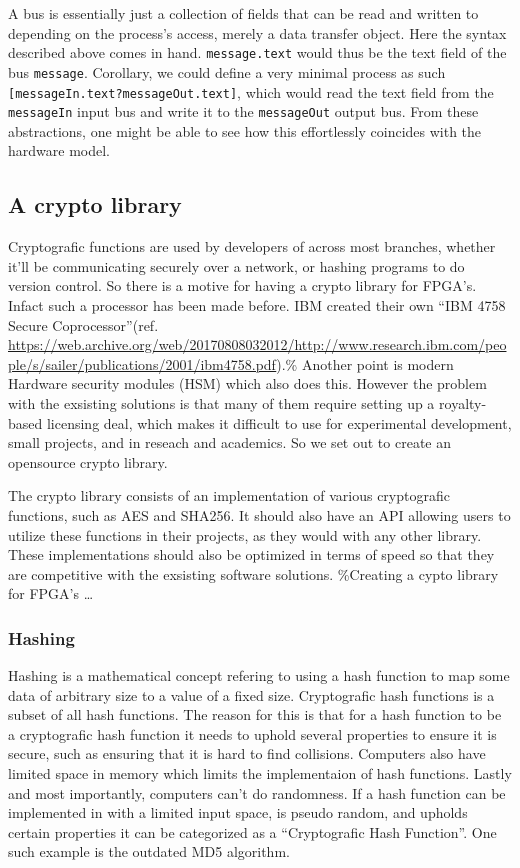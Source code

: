 \documentclass[a4paper]{article}
\begin{document}
A bus is essentially just a collection of fields that can be read and written to depending on the process's access, merely a data transfer object. Here the syntax described above comes in hand. \texttt{message.text} would thus be the text field of the bus \texttt{message}. Corollary, we could define a very minimal process as such \texttt{[messageIn.text?messageOut.text]}, which would read the text field from the \texttt{messageIn} input bus and write it to the \texttt{messageOut} output bus. From these abstractions, one might be able to see how this effortlessly coincides with the hardware model.
\subsection{A crypto library}
\label{sec:org9738384}
Cryptografic functions are used by developers of across most branches, whether it'll be communicating securely over a network, or hashing programs to do version control.
So there is a motive for having a crypto library for FPGA's. Infact such a processor has been made before. IBM created their own ``IBM 4758 Secure Coprocessor''(ref. \url{https://web.archive.org/web/20170808032012/http://www.research.ibm.com/people/s/sailer/publications/2001/ibm4758.pdf}).\% Another point is modern Hardware security modules (HSM) which also does this.
However the problem with the exsisting solutions is that many of them require setting up a royalty-based licensing deal, which makes it difficult to use for experimental development, small projects, and in reseach and academics.
So we set out to create an opensource crypto library.

The crypto library consists of an implementation of various cryptografic functions, such as AES and SHA256. It should also have an API allowing users to utilize these functions in their projects, as they would with any other library.
These implementations should also be optimized in terms of speed so that they are competitive with the exsisting software solutions.
\%Creating a cypto library for FPGA's \ldots{}
\subsubsection{Hashing}
\label{sec:org27ba90d}
Hashing is a mathematical concept refering to using a hash function to map some data of arbitrary size to a value of a fixed size. Cryptografic hash functions is a subset of all hash functions.
The reason for this is that for a hash function to be a cryptografic hash function it needs to uphold several properties to ensure it is secure, such as ensuring that it is hard to find collisions. Computers also have limited space in memory which limits the implementaion of hash functions. Lastly and most importantly, computers can't do randomness.
If a hash function can be implemented in with a limited input space, is pseudo random, and upholds certain properties it can be categorized as a ``Cryptografic Hash Function''. One such example is the outdated MD5 algorithm.
\end{document}
